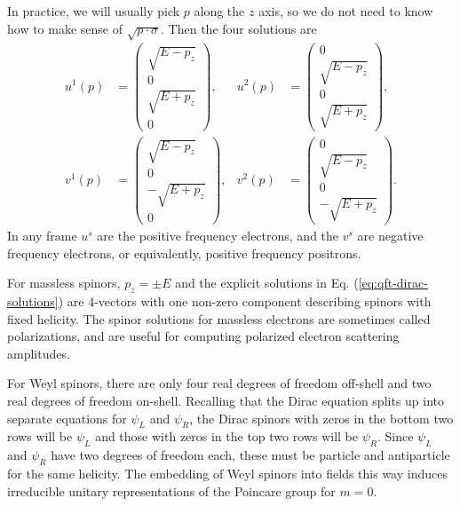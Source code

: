 In practice, we will usually pick $p$ along the $z$ axis, so we do not need to know how to make sense of $\sqrt{p \cdot \sigma}$. Then the four solutions are
\begin{equation}\label{eq:qft-dirac-solutions}
\begin{aligned}
	u^{1}(p) &= \begin{pmatrix}
		\sqrt{E-p_{z}} \\ 0 \\
		\sqrt{E+p_{z}} \\ 0
	\end{pmatrix}, & 
	u^{2}(p) &= \begin{pmatrix}
		0 \\ \sqrt{E-p_{z}} \\
		0 \\ \sqrt{E+p_{z}}
	\end{pmatrix}, \\
	v^{1}(p) &= \begin{pmatrix}
		\sqrt{E-p_{z}} \\ 0 \\
		-\sqrt{E+p_{z}} \\ 0
	\end{pmatrix}, & 
	v^{2}(p) &= \begin{pmatrix}
		0 \\ \sqrt{E-p_{z}} \\
		0 \\ -\sqrt{E+p_{z}}
	\end{pmatrix}.
\end{aligned}
\end{equation}
In any frame $u^{s}$ are the positive frequency electrons, and the $v^{s}$ are negative frequency electrons, or equivalently, positive frequency positrons.

For massless spinors, $p_{z}=\pm E$ and the explicit solutions in Eq. (\ref{eq:qft-dirac-solutions}) are 4-vectors with one non-zero component describing spinors with fixed helicity. 
The spinor solutions for massless electrons are sometimes called polarizations, and are useful for computing polarized electron scattering amplitudes.

For Weyl spinors, there are only four real degrees of freedom off-shell and two real degrees of freedom on-shell. 
Recalling that the Dirac equation splits up into separate equations for $\psi_{L}$ and $\psi_{R}$, the Dirac spinors with zeros in the bottom two rows will be $\psi_{L}$ and those with zeros in the top two rows will be $\psi_{R}$. 
Since $\psi_{L}$ and $\psi_{R}$ have two degrees of freedom each, these must be particle and antiparticle for the same helicity. 
The embedding of Weyl spinors into fields this way induces irreducible unitary representations of the Poincare group for $m=0$.

